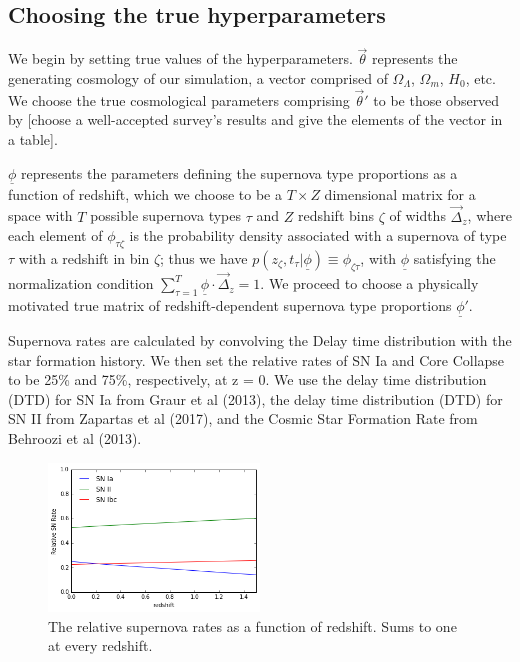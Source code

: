 \documentclass[12pt, onecolumn]{emulateapj}
\newcommand{\textul}{\underline}
\begin{document}
\subsection{Choosing the true hyperparameters}
\label{sec:true_hypers}

We begin by setting true values of the hyperparameters.  $\vec{\theta}$ represents the generating cosmology of our simulation, a vector comprised of $\Omega_{\Lambda}$, $\Omega_{m}$, $H_{0}$, etc.  We choose the true cosmological parameters comprising $\vec{\theta}'$ to be those observed by [choose a well-accepted survey's results and give the elements of the vector in a table].  

$\textul{\phi}$ represents the parameters defining the supernova type proportions as a function of redshift, which we choose to be a $T\times Z$ dimensional matrix for a space with $T$ possible supernova types $\tau$ and $Z$ redshift bins $\zeta$ of widths $\vec{\Delta}_{z}$, where each element of $\phi_{\tau\zeta}$ is the probability density associated with a supernova of type $\tau$ with a redshift in bin $\zeta$; thus we have $p(z_{\zeta}, t_{\tau} | \textul{\phi}) \equiv \phi_{\zeta\tau}$, with $\textul{\phi}$ satisfying the normalization condition $\sum_{\tau=1}^{T}\textul{\phi}\cdot\vec{\Delta}_{z}=1$.  We proceed to choose a physically motivated true matrix of redshift-dependent supernova type proportions $\textul{\phi}'$.

Supernova rates are calculated by convolving the Delay time distribution with the star formation history. We then set the relative rates of SN Ia and Core Collapse to be 25\% and 75\%, respectively, at z = 0. We use the delay time distribution (DTD) for SN Ia from Graur et al (2013), the delay time distribution (DTD) for SN II from Zapartas et al (2017), and the Cosmic Star Formation Rate from Behroozi et al (2013).

\begin{figure}
	\begin{center}
		\includegraphics[width=0.5\textwidth]{relative_supernova_rate.png}
		\caption{The relative supernova rates as a function of redshift. Sums to one at every redshift.}
		\label{fig:realtive_supernova_rates}
	\end{center}
\end{figure}
\end{document}
